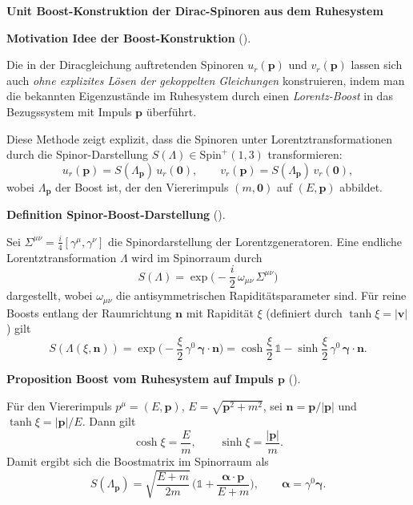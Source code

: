 \documentclass[10pt, letterpaper]{article}
\newcommand{\Spin}{\mathrm{Spin}}
\newcommand{\CustomHeading}[3]{%
  \par\medskip\noindent%
  \textbf{#1 #2} \textnormal{(#3)}.\enskip%
}
\newenvironment{DEF}[2]{\begin{unitbox}\CustomHeading{Definition}{#1}{#2}}{\end{unitbox}}
\newenvironment{PROP}[2]{\begin{unitbox}\CustomHeading{Proposition}{#1}{#2}}{\end{unitbox}}
\newenvironment{MOT}[2]{\begin{unitbox}\CustomHeading{Motivation}{#1}{#2}}{\end{unitbox}}
\newenvironment{unit}[1]
  {\begin{unitbox}\textbf{Unit #1}\par\smallskip}
  {\end{unitbox}}
\begin{document}
\begin{unit}{Boost-Konstruktion der Dirac-Spinoren aus dem Ruhesystem}

\begin{MOT}{Idee der Boost-Konstruktion}{}
Die in der Diracgleichung auftretenden Spinoren $u_r(\mathbf p)$ und $v_r(\mathbf p)$ lassen sich auch \emph{ohne explizites Lösen der gekoppelten Gleichungen} konstruieren, indem man die bekannten Eigenzustände im Ruhesystem durch einen \emph{Lorentz-Boost} in das Bezugssystem mit Impuls $\mathbf p$ überführt.  

Diese Methode zeigt explizit, dass die Spinoren unter Lorentztransformationen durch die Spinor-Darstellung $S(\Lambda)\in \Spin^+(1,3)$ transformieren:
\[
u_r(\mathbf p) = S(\Lambda_{\mathbf p})\,u_r(\mathbf 0),\qquad
v_r(\mathbf p) = S(\Lambda_{\mathbf p})\,v_r(\mathbf 0),
\]
wobei $\Lambda_{\mathbf p}$ der Boost ist, der den Viererimpuls $(m,\mathbf 0)$ auf $(E,\mathbf p)$ abbildet.
\end{MOT}

\begin{DEF}{Spinor-Boost-Darstellung}{}
Sei $\Sigma^{\mu\nu}=\frac{i}{4}[\gamma^\mu,\gamma^\nu]$ die Spinordarstellung der Lorentzgeneratoren.  
Eine endliche Lorentztransformation $\Lambda$ wird im Spinorraum durch
\[
S(\Lambda)=\exp\!\Big(-\frac{i}{2}\,\omega_{\mu\nu}\,\Sigma^{\mu\nu}\Big)
\]
dargestellt, wobei $\omega_{\mu\nu}$ die antisymmetrischen Rapiditätsparameter sind.  
Für reine Boosts entlang der Raumrichtung $\mathbf n$ mit Rapidität $\xi$ (definiert durch $\tanh\xi=|\mathbf v|$) gilt
\[
S(\Lambda(\xi,\mathbf n))=\exp\!\Big(-\frac{\xi}{2}\,\gamma^0\,\boldsymbol{\gamma}\cdot\mathbf n\Big)
=\cosh\!\frac{\xi}{2}\,\mathbb 1 - \sinh\!\frac{\xi}{2}\,\gamma^0\,\boldsymbol{\gamma}\cdot\mathbf n.
\]
\end{DEF}

\begin{PROP}{Boost vom Ruhesystem auf Impuls $\mathbf p$}{}
Für den Viererimpuls $p^\mu=(E,\mathbf p)$, $E=\sqrt{\mathbf p^2+m^2}$, sei $\mathbf n=\mathbf p/|\mathbf p|$ und $\tanh\xi=|\mathbf p|/E$. Dann gilt
\[
\cosh\xi=\frac{E}{m},\qquad \sinh\xi=\frac{|\mathbf p|}{m}.
\]
Damit ergibt sich die Boostmatrix im Spinorraum als
\[
\boxed{
S(\Lambda_{\mathbf p})
=\sqrt{\frac{E+m}{2m}}\,
\Big(\mathbb 1 + \frac{\boldsymbol{\alpha}\cdot\mathbf p}{E+m}\Big),
\qquad \boldsymbol{\alpha}=\gamma^0\boldsymbol{\gamma}.
}
\]
\end{PROP}


\end{unit}
\end{document}
